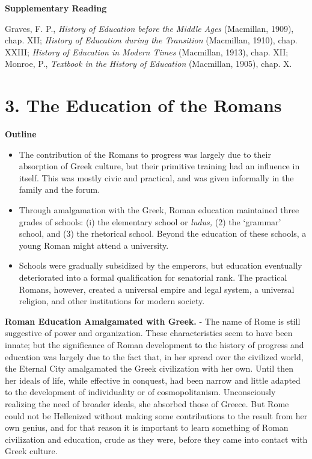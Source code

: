 \documentclass[]{book}
\providecommand{\tightlist}{%
  \setlength{\itemsep}{0pt}\setlength{\parskip}{0pt}}
\begin{document}
\textbf{Supplementary Reading}

Graves, F. P., \emph{History of Education before the Middle Ages} (Macmillan, 1909), chap. XII; \emph{History of Education during the Transition} (Macmillan, 1910), chap. XXIII; \emph{History of Education in Modern Times} (Macmillan, 1913), chap. XII; Monroe, P., \emph{Textbook in the History of Education} (Macmillan, 1905), chap. X.

\hypertarget{the-education-of-the-romans}{%
\chapter{3. The Education of the Romans}\label{the-education-of-the-romans}}

\textbf{Outline}

\begin{itemize}
\tightlist
\item
  The contribution of the Romans to progress was largely due to their absorption of Greek culture, but their primitive training had an influence in itself. This was mostly civic and practical, and was given informally in the family and the forum.
\item
  Through amalgamation with the Greek, Roman education maintained three grades of schools: (i) the elementary school or \emph{ludus,} (2) the `grammar' school, and (3) the rhetorical school. Beyond the education of these schools, a young Roman might attend a university.
\item
  Schools were gradually subsidized by the emperors, but education eventually deteriorated into a formal qualification for senatorial rank. The practical Romans, however, created a universal empire and legal system, a universal religion, and other institutions for modern society.
\end{itemize}

\textbf{Roman Education Amalgamated with Greek.} - The name of Rome is still suggestive of power and organization. These characteristics seem to have been innate; but the significance of Roman development to the history of progress and education was largely due to the fact that, in her spread over the civilized world, the Eternal City amalgamated the Greek civilization with her own. Until then her ideals of life, while effective in conquest, had been narrow and little adapted to the development of individuality or of cosmopolitanism. Unconsciously realizing the need of broader ideals, she absorbed those of Greece. But Rome could not be Hellenized without making some contributions to the result from her own genius, and for that reason it is important to learn something of Roman civilization and education, crude as they were, before they came into contact with Greek culture.
\end{document}
